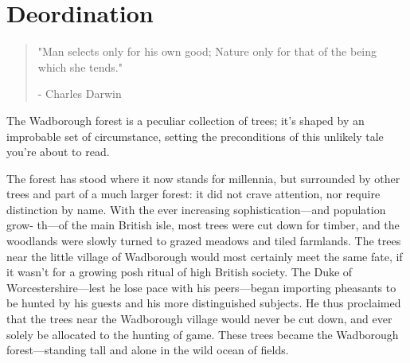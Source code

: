 
\chapter{Deordination}
\vspace{-1.3cm}
\begin{localsize}{10}
	\begin{quote}
		"Man selects only for his own good; Nature only for that of the being which she tends."
		\begin{flushright}- Charles Darwin\end{flushright}
	\end{quote} 
\end{localsize}
\vspace{1cm}

The Wadborough forest is a peculiar collection of trees; it's shaped by an improbable set of circumstance, setting the preconditions of this unlikely tale you're about to read. %

The forest has stood where it now stands for millennia, but surrounded by other trees and part of a much larger forest: it did not crave attention, nor require distinction by name. With the ever increasing sophistication---and population grow- th---of the main British isle, most trees were cut down for timber, and the woodlands were slowly turned to grazed meadows and tiled farmlands. The trees near the little village of Wadborough would most certainly meet the same fate, if it wasn't for a growing posh ritual of high British society. The Duke of Worcestershire---lest he lose pace with his peers---began importing pheasants to be hunted by his guests and his more distinguished subjects. He thus proclaimed that the trees near the Wadborough village would never be cut down, and ever solely be allocated to the hunting of game. These trees became the Wadborough forest---standing tall and alone in the wild ocean of fields.

